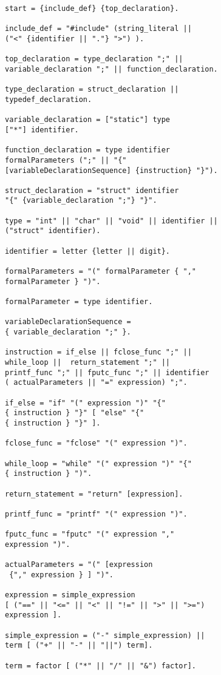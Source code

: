 \documentclass[a4paper,12pt]{article}
\begin{document}
	\begin{lstlisting}	
start = {include_def} {top_declaration}.

include_def = "#include" (string_literal ||
("<" {identifier || "."} ">") ).

top_declaration = type_declaration ";" ||
variable_declaration ";" || function_declaration.

type_declaration = struct_declaration ||
typedef_declaration.

variable_declaration = ["static"] type 
["*"] identifier.

function_declaration = type identifier 
formalParameters (";" || "{" 
[variableDeclarationSequence] {instruction} "}").

struct_declaration = "struct" identifier
"{" {variable_declaration ";"} "}".

type = "int" || "char" || "void" || identifier || 
("struct" identifier).

identifier = letter {letter || digit}.

formalParameters = "(" formalParameter { "," 
formalParameter } ")".

formalParameter = type identifier.

variableDeclarationSequence =
{ variable_declaration ";" }.

instruction = if_else || fclose_func ";" || 
while_loop ||  return_statement ";" || 
printf_func ";" || fputc_func ";" || identifier 
( actualParameters || "=" expression) ";".

if_else = "if" "(" expression ")" "{" 
{ instruction } "}" [ "else" "{" 
{ instruction } "}" ].

fclose_func = "fclose" "(" expression ")".

while_loop = "while" "(" expression ")" "{"
{ instruction } ")".

return_statement = "return" [expression].

printf_func = "printf" "(" expression ")".

fputc_func = "fputc" "(" expression "," 
expression ")".

actualParameters = "(" [expression
 {"," expression } ] ")".

expression = simple_expression 
[ ("==" || "<=" || "<" || "!=" || ">" || ">=")
expression ].

simple_expression = ("-" simple_expression) ||
term [ ("+" || "-" || "||") term].

term = factor [ ("*" || "/" || "&") factor].


\end{lstlisting}
\end{document}
